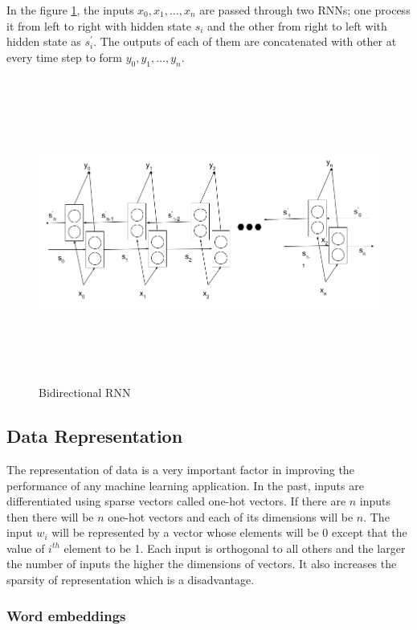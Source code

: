 \documentclass[a4paper, 11pt]{article}
\begin{document}
In the figure \ref{fig:bi-directional-rnn-1.png}, the inputs $x_0,x_1,\dots,x_n$  are passed through two RNNs; one process it from left to right with hidden state $s_i$ and the other from right to left with hidden state as $s^{'}_i$. The outputs of each of them are concatenated with other at every time step to form $y_0,y_1,\dots,y_n$.
\begin{figure}[H]
    \centering
    \includegraphics[width=\textwidth,height=10cm,keepaspectratio=true]
    {bi-directional-rnn-1.png}
    \caption{
        Bidirectional RNN
    }
    \label{fig:bi-directional-rnn-1.png}
\end{figure}

\subsection{Data Representation}

The representation of data is a very important factor in improving the performance of any machine learning application. In the past, inputs are differentiated using sparse vectors called one-hot vectors. If there are $n$ inputs then there will be  $n$ one-hot vectors and each of its dimensions will be $n$. The input $w_i$ will be represented by a vector whose elements will be 0 except that the value of $i^{th}$ element to be 1. Each input is orthogonal to all others and the larger the number of inputs the higher the dimensions of vectors. It also increases the sparsity of representation which is a disadvantage. 

\subsubsection{Word embeddings}
\end{document}
